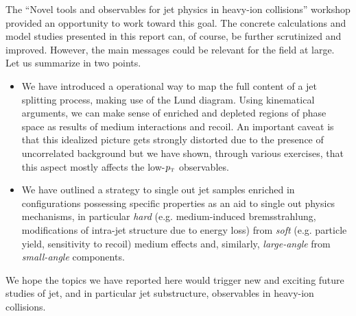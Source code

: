 The ``Novel tools and observables for jet physics in heavy-ion collisions'' workshop provided an opportunity to work toward this goal.
The concrete calculations and model studies presented in this report can, of course, be further scrutinized and improved. However, the main messages could be relevant for the field at large. Let us summarize in two points.
\begin{itemize}

\item We have introduced a operational way to map the full content of a jet splitting process, making use of the Lund diagram. Using kinematical arguments, we can make sense of enriched and depleted regions of phase space as results of medium interactions and recoil. An important caveat is that this idealized picture gets strongly distorted due to the presence of uncorrelated background but we have shown, through various exercises, that this aspect mostly affects the low-$p_{\text{\tiny T}}$ observables.

\item We have outlined a strategy to single out jet samples enriched in configurations possessing specific properties as an aid to single out physics mechanisms, in particular \textsl{hard} (e.g. medium-induced bremsstrahlung, modifications of intra-jet structure due to energy loss) from \textsl{soft} (e.g. particle yield, sensitivity to recoil) medium effects and, similarly, \textsl{large-angle} from \textsl{small-angle} components.

\end{itemize}
We hope the topics we have reported here would trigger new and exciting future studies of jet, and in particular jet substructure, observables in heavy-ion collisions.

